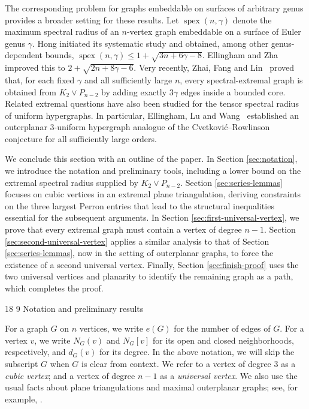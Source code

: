 \documentclass[11pt]{article}
\makeatletter
\renewcommand\section{\@startsection{section}{1}{\z@}%
{18\p@ \@plus 6\p@ \@minus 3\p@}%
{9\p@ \@plus 6\p@ \@minus 3\p@}%
{\large\bfseries\boldmath}}
\theoremstyle{plain}
\theoremstyle{definition}
\numberwithin{equation}{section}
\makeatother
\begin{document}
The corresponding problem for graphs embeddable on surfaces of arbitrary genus provides a broader 
setting for these results. Let $\operatorname{spex}(n,\gamma)$ denote the maximum spectral radius of an
$n$-vertex graph embeddable on a surface of Euler genus $\gamma$. Hong
initiated its systematic study and obtained, among other genus-dependent bounds,
$\operatorname{spex}(n,\gamma) \leq 1+\sqrt{3n+6\gamma-8}$. Ellingham and Zha \cite{EllinghamZha2000} improved this to $2+\sqrt{2n+8\gamma-6}$. Very recently, 
Zhai, Fang and Lin~\cite{ZhaiFangLin2026} proved that, for each fixed $\gamma$ and all
sufficiently large $n$, every spectral-extremal graph is obtained from $K_2\vee P_{n-2}$ by 
adding exactly $3\gamma$ edges inside a bounded core. Related extremal questions have also 
been studied for the tensor spectral radius of uniform hypergraphs. In particular, Ellingham, Lu and Wang~\cite{EllinghamLuWang2022} established an outerplanar $3$-uniform hypergraph analogue of 
the Cvetkovi\'c--Rowlinson conjecture for all sufficiently large orders.

We conclude this section with an outline of the paper. In Section \ref{sec:notation}, we
introduce the notation and preliminary tools, including a lower bound on the extremal spectral radius
supplied by $K_2\vee P_{n-2}$. Section \ref{sec:series-lemmas} focuses on cubic vertices in
an extremal plane triangulation, deriving constraints on the three largest Perron entries that lead to the structural inequalities essential for the subsequent arguments. In
Section \ref{sec:first-universal-vertex}, we prove that every extremal graph must contain a vertex of degree $n-1$. Section \ref{sec:second-universal-vertex} applies a similar analysis to that of Section \ref{sec:series-lemmas}, now in the setting of outerplanar graphs, to force the existence of a second universal vertex. Finally, Section \ref{sec:finish-proof}
uses the two universal vertices and planarity to identify the remaining graph
as a path, which completes the proof.


\section{Notation and preliminary results}
\label{sec:notation}

For a graph $G$ on $n$ vertices, we write $e(G)$ for the number of edges of $G$. For a vertex $v$, 
we write $N_G(v)$ and $N_G[v]$ for its open and closed neighborhoods, respectively, 
and $d_G(v)$ for its degree. In the above notation, we will skip the subscript $G$ 
when $G$ is clear from context. 
We refer to a vertex of degree $3$ as a \emph{cubic vertex}; and a vertex of degree $n-1$ as a \emph{universal vertex}.
We also use the usual facts about plane triangulations and maximal outerplanar graphs; 
see, for example, \cite[Chapter 10]{BondyMurty}.
\end{document}
